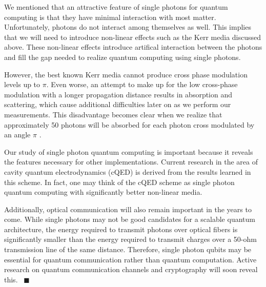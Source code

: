 We mentioned that an attractive feature of single photons for quantum computing is that they have minimal interaction with most matter. Unfortunately, photons do not interact among themselves as well. This implies that we will need to introduce non-linear effects such as the Kerr media discussed above. These non-linear effects introduce artifical interaction between the photons and fill the gap needed to realize quantum computing using single photons. 

However, the best known Kerr media cannot produce cross phase modulation levels up to $\pi$. Even worse, an attempt to make up for the low cross-phase modulation with a longer propagation distance results in absorption and scattering, which cause additional difficulties later on as we perform our measurements. This disadvantage becomes clear when we realize that approximately 50 photons will be absorbed for each photon cross modulated by an angle $\pi$ \cite{nielsen2000}. 

Our study of single photon quantum computing is important because it reveals the features necessary for other implementations. Current research in the area of cavity quantum electrodynamics (cQED) is derived from the results learned in this scheme. In fact, one may think of the cQED scheme as single photon quantum computing with significantly better non-linear media.

Additionally, optical communication will also remain important in the years to come. While single photons may not be good candidates for a scalable quantum architecture, the energy required to transmit photons over optical fibers is significantly smaller than the energy required to transmit charges over a 50-ohm transmission line of the same distance. Therefore, single photon qubits may be essential for quantum communication rather than quantum computation. Active research on quantum communication channels and cryptography will soon reveal this.
~\hfill$\blacksquare$
